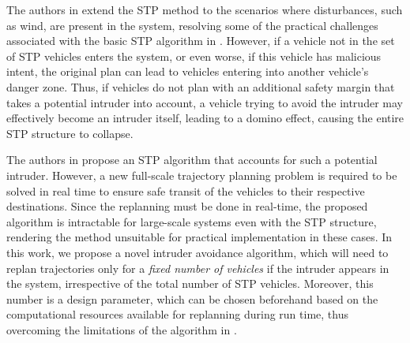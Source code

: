 The authors in \cite{Bansal2017} extend the STP method to the scenarios where disturbances, such as wind, are present in the system, resolving some of the practical challenges associated with the basic STP algorithm in \cite{Chen15c}. However, if a vehicle not in the set of STP vehicles enters the system, or even worse, if this vehicle has malicious intent, the original plan can lead to vehicles entering into another vehicle's danger zone. Thus, if vehicles do not plan with an additional safety margin that takes a potential intruder into account, a vehicle trying to avoid the intruder may effectively become an intruder itself, leading to a domino effect, causing the entire STP structure to collapse. 

The authors in \cite{chen2016robust} propose an STP algorithm that accounts for such a potential intruder. However, a new full-scale trajectory planning problem is required to be solved in real time to ensure safe transit of the vehicles to their respective destinations. Since the replanning must be done in real-time, the proposed algorithm is intractable for large-scale systems even with the STP structure, rendering the method unsuitable for practical implementation in these cases. In this work, we propose a novel intruder avoidance algorithm, which will need to replan trajectories only for a \textit{fixed number of vehicles} if the intruder appears in the system, irrespective of the total number of STP vehicles. Moreover, this number is a design parameter, which can be chosen beforehand based on the computational resources available for replanning during run time, thus overcoming the limitations of the algorithm in \cite{chen2016robust}. 

